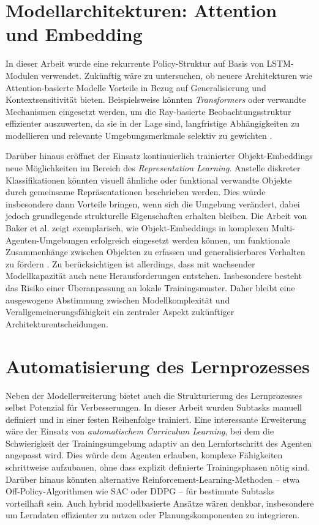 \section{Modellarchitekturen: Attention und Embedding}

In dieser Arbeit wurde eine rekurrente Policy-Struktur auf Basis von LSTM-Modulen verwendet. Zukünftig wäre zu untersuchen, ob neuere Architekturen wie Attention-basierte Modelle Vorteile in Bezug auf Generalisierung und Kontextsensitivität bieten. Beispielsweise könnten \textit{Transformers} oder verwandte Mechanismen eingesetzt werden, um die Ray-basierte Beobachtungsstruktur effizienter auszuwerten, da sie in der Lage sind, langfristige Abhängigkeiten zu modellieren und relevante Umgebungsmerkmale selektiv zu gewichten \cite{parisotto2020stabilizing}.

Darüber hinaus eröffnet der Einsatz kontinuierlich trainierter Objekt-Embeddings neue Möglichkeiten im Bereich des \textit{Representation Learning}. Anstelle diskreter Klassifikationen könnten visuell ähnliche oder funktional verwandte Objekte durch gemeinsame Repräsentationen beschrieben werden. Dies würde insbesondere dann Vorteile bringen, wenn sich die Umgebung verändert, dabei jedoch grundlegende strukturelle Eigenschaften erhalten bleiben. Die Arbeit von Baker et al. zeigt exemplarisch, wie Objekt-Embeddings in komplexen Multi-Agenten-Umgebungen erfolgreich eingesetzt werden können, um funktionale Zusammenhänge zwischen Objekten zu erfassen und generalisierbares Verhalten zu fördern \cite{baker2020emergenttoolusemultiagent}. Zu berücksichtigen ist allerdings, dass mit wachsender Modellkapazität auch neue Herausforderungen entstehen. Insbesondere besteht das Risiko einer Überanpassung an lokale Trainingsmuster. Daher bleibt eine ausgewogene Abstimmung zwischen Modellkomplexität und Verallgemeinerungsfähigkeit ein zentraler Aspekt zukünftiger Architekturentscheidungen.

\section{Automatisierung des Lernprozesses}

Neben der Modellerweiterung bietet auch die Strukturierung des Lernprozesses selbst Potenzial für Verbesserungen. In dieser Arbeit wurden Subtasks manuell definiert und in einer festen Reihenfolge trainiert. Eine interessante Erweiterung wäre der Einsatz von \textit{automatischem Curriculum Learning}, bei dem die Schwierigkeit der Trainingsumgebung adaptiv an den Lernfortschritt des Agenten angepasst wird. Dies würde dem Agenten erlauben, komplexe Fähigkeiten schrittweise aufzubauen, ohne dass explizit definierte Trainingsphasen nötig sind. Darüber hinaus könnten alternative Reinforcement-Learning-Methoden – etwa Off-Policy-Algorithmen wie SAC oder DDPG – für bestimmte Subtasks vorteilhaft sein. Auch hybrid modellbasierte Ansätze wären denkbar, insbesondere um Lerndaten effizienter zu nutzen oder Planungskomponenten zu integrieren.
